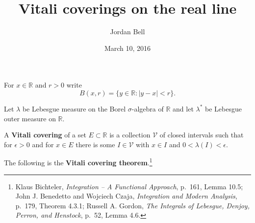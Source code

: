 \documentclass{article}
\theoremstyle{definition}
\begin{document}
\title{Vitali coverings on the real line}
\author{Jordan Bell}
\date{March 10, 2016}

\maketitle

For $x \in \mathbb{R}$ and $r>0$ write
\[
B(x,r) = \{y \in \mathbb{R}: |y-x|<r\}.
\]

Let
$\lambda$ be Lebesgue measure on the Borel $\sigma$-algebra of $\mathbb{R}$ and
let $\lambda^*$ be Lebesgue outer measure on $\mathbb{R}$. 

A \textbf{Vitali covering} of a set $E \subset \mathbb{R}$ is a collection $\mathcal{V}$ 
of  closed intervals such that for $\epsilon>0$ and for $x \in E$ there is some $I \in \mathcal{V}$ 
with $x \in I$ and
$0<\lambda(I)<\epsilon$.

The following is the \textbf{Vitali covering theorem}.\footnote{Klaus Bichteler, {\em Integration -- A Functional Approach},
p.~161, Lemma 10.5;
John J. Benedetto and Wojciech Czaja, {\em Integration and Modern Analysis}, p.~179, Theorem 4.3.1;
Russell A. Gordon, {\em The Integrals of Lebesgue, Denjoy, Perron, and Henstock}, p.~52, Lemma 4.6.}
\end{document}
